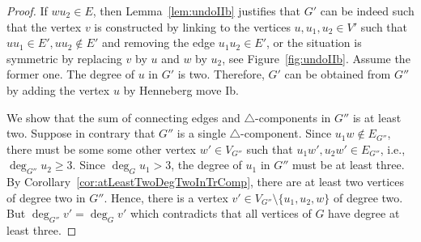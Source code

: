 \documentclass[a4paper, 11pt]{article}
\newcommand{\trcomp}{$\triangle$-component}
\newcommand{\trcomps}{$\triangle$-components}
\theoremstyle{definition}
\begin{document}
\begin{proof}
If $wu_2\in E$, then Lemma~\ref{lem:undoIIb} justifies that $G'$ can be indeed such that the vertex $v$ is constructed by linking to the vertices $u,u_1,u_2 \in V'$ such that $uu_1\in E',uu_2\notin E'$ and removing the edge $u_1u_2\in E'$, or the situation is symmetric by replacing $v$ by $u$ and $w$ by $u_2$, see Figure~\ref{fig:undoIIb}. Assume the former one. The degree of $u$ in $G'$ is two. Therefore, $G'$ can be obtained from $G''$ by adding the vertex $u$ by Henneberg move Ib. 

We show that the sum of connecting edges and \trcomps{} in $G''$ is at least two. Suppose in contrary that $G''$ is a single \trcomp{}. Since $u_1w\notin E_{G''}$, there must be some some other vertex $w'\in V_{G''}$ such that $u_1w',u_2w'\in E_{G''}$, i.e., $\deg_{G''} u_2 \geq 3$. Since $\deg_G u_1>3$, the degree of $u_1$ in $G''$ must be at least three. By Corollary~\ref{cor:atLeastTwoDegTwoInTrComp}, there are at least two vertices of degree two in $G''$. Hence, there is a vertex $v'\in V_{G''}\setminus\{u_1,u_2,w\}$ of degree two. But $\deg_{G''}v'=\deg_G v'$ which contradicts that all vertices of $G$ have degree at least three. 


\end{proof}
\end{document}
